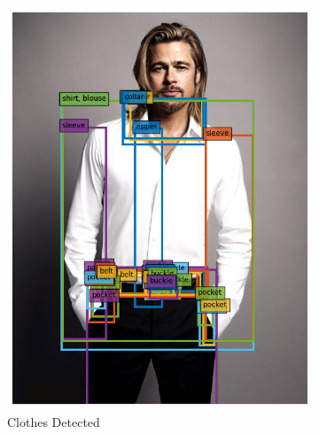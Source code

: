 \begin{figure}[H]
\begin{subfigure}[b]{0.3\textwidth}
      \includegraphics[width=\textwidth]{images/2detected_image.png}
      \caption{Clothes Detected}
  \end{subfigure}
  \begin{subfigure}[b]{0.2\textwidth}

\end{subfigure}
\end{figure}
